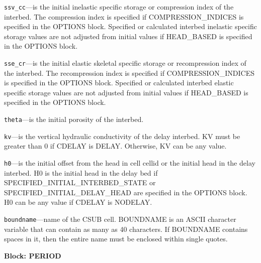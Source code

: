\begin{description}
\item \texttt{ssv\_cc}---is the initial inelastic specific storage or compression index of the interbed. The compression index is specified if COMPRESSION\_INDICES is specified in the OPTIONS block. Specified or calculated interbed inelastic specific storage values are not adjusted from initial values if HEAD\_BASED is specified in the OPTIONS block.

\item \texttt{sse\_cr}---is the initial elastic skeletal specific storage or recompression index of the interbed. The recompression index is specified if COMPRESSION\_INDICES is specified in the OPTIONS block. Specified or calculated interbed elastic specific storage values are not adjusted from initial values if HEAD\_BASED is specified in the OPTIONS block.

\item \texttt{theta}---is the initial porosity of the interbed.

\item \texttt{kv}---is the vertical hydraulic conductivity of the delay interbed. KV must be greater than 0 if CDELAY is DELAY. Otherwise, KV can be any value.

\item \texttt{h0}---is the initial offset from the head in cell cellid or the initial head in the delay interbed. H0 is the initial head in the delay bed if SPECIFIED\_INITIAL\_INTERBED\_STATE or SPECIFIED\_INITIAL\_DELAY\_HEAD are specified in the OPTIONS block. H0 can be any value if CDELAY is NODELAY.

\item \texttt{boundname}---name of the CSUB cell.  BOUNDNAME is an ASCII character variable that can contain as many as 40 characters.  If BOUNDNAME contains spaces in it, then the entire name must be enclosed within single quotes.

\end{description}
\item \textbf{Block: PERIOD}

